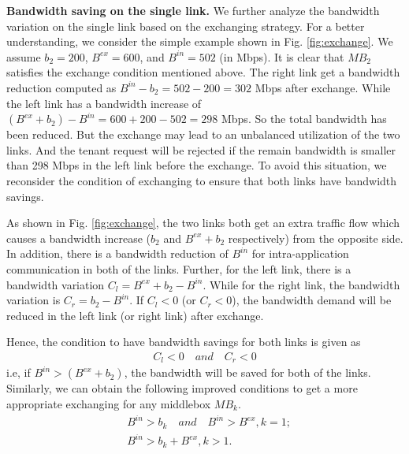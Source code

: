 \documentclass[review]{elsarticle}
\begin{document}
\textbf{Bandwidth saving on the single link.} 
We further analyze the bandwidth variation on the single link %
based on the exchanging strategy.   
For a better understanding,
we consider the simple example shown in Fig. \ref{fig:exchange}.
 We assume $b_2 = 200$, $B^{ex} = 600$, and $B^{in} = 502$ (in Mbps). It is clear that $MB_2$ satisfies the exchange condition mentioned above.  The right link get a bandwidth reduction computed as $B^{in}-b_2=502-200=302$ Mbps after exchange. While the left link has a bandwidth increase of $(B^{ex}+b_2)-B^{in}=600+200-502=298$ Mbps. So the total bandwidth has been reduced. But the exchange may lead to an unbalanced utilization of the two links. And the tenant request will be rejected if the remain bandwidth is smaller than 298 Mbps in the left link before the exchange. To avoid this situation, we reconsider the condition of exchanging to ensure that both links have bandwidth savings. 

As shown in Fig. \ref{fig:exchange}, the two links both get an extra traffic flow which causes a bandwidth increase ($b_2$ and $B^{ex}+b_2$ respectively) from the opposite side.
In addition, there is a bandwidth reduction of $B^{in}$ for intra-application communication in both of the links. Further, for the left link, there is a bandwidth variation $C_l=B^{ex}+b_2-B^{in}$. While for the right link, the bandwidth variation is $C_r=b_2-B^{in}$. If $C_l<0$ (or $C_r<0$), the bandwidth demand will be reduced in the left link (or right link) after exchange. 

Hence, the condition to have bandwidth savings for both links is given as
\begin{equation}
\begin{aligned}
C_l<0\quad and \quad C_r<0 %
\end{aligned}
\end{equation}
i.e, if $B^{in}>(B^{ex}+b_2)$, the bandwidth will be saved for both of the links. Similarly, we can obtain the following improved conditions to get a more appropriate exchanging for any middlebox $MB_k$. 
\begin{equation}
\begin{aligned}
&B^{in}>b_k\quad and \quad B^{in}>B^{ex}, k=1;\\
&B^{in}>b_k+B^{ex}, k>1.
\end{aligned}
\label{equ:condition}
\end{equation}
\end{document}
